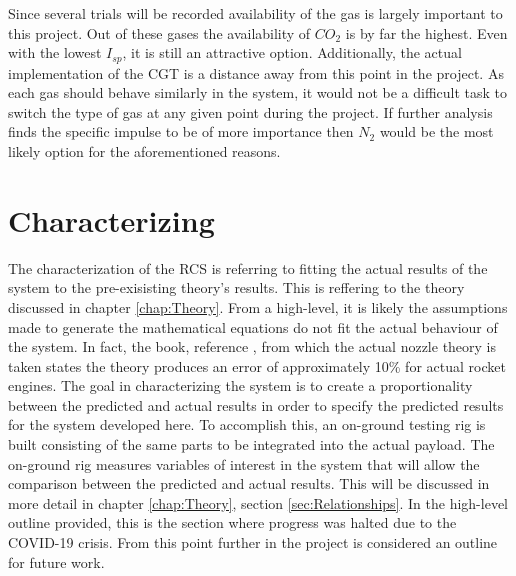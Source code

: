 Since several trials will be recorded availability of the gas is largely important to this project. Out of these gases the availability of $CO_2$ is by far the highest. Even with the lowest $I_{sp}$, it is still an attractive option. Additionally, the actual implementation of the CGT is a distance away from this point in the project. As each gas should behave similarly in the system, it would not be a difficult task to switch the type of gas at any given point during the project. If further analysis finds the specific impulse to be of more importance then $N_2$ would be the most likely option for the aforementioned reasons. 
\section{Characterizing}
The characterization of the RCS is referring to fitting the actual results of the system to the pre-exisisting theory's results. This is reffering to the theory discussed in chapter \ref{chap:Theory}. From a high-level, it is likely the assumptions made to generate the mathematical equations do not fit the actual behaviour of the system. In fact, the book, reference \cite{langton}, from which the actual nozzle theory is taken states the theory produces an error of approximately 10\% for actual rocket engines. The goal in characterizing the system is to create a proportionality between the predicted and actual results in order to specify the predicted results for the system developed here. To accomplish this, an on-ground testing rig is built consisting of the same parts to be integrated into the actual payload. The on-ground rig measures variables of interest in the system that will allow the comparison between the predicted and actual results. This will be discussed in more detail in chapter \ref{chap:Theory}, section \ref{sec:Relationships}. In the high-level outline provided, this is the section where progress was halted due to the COVID-19 crisis. From this point further in the project is considered an outline for future work.
